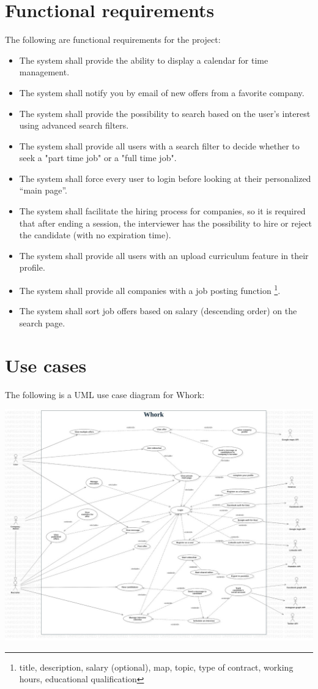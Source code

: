 \documentclass[12pt, a4paper]{article}
\begin{document}
\newpage
\section{Functional requirements}
The following are functional requirements for the project:
\begin{itemize}
	\item The system shall provide the ability to display a calendar for time management.
	\item The system shall notify you by email of new offers from a favorite company.
	\item The system shall provide the possibility to search based on the user's interest using advanced search filters.
	\item The system shall provide all users with a search filter to decide whether to seek a
	"part time job" or a "full time job".
	\item The system shall force every user to login before looking at their personalized “main page”.
	\item The system shall facilitate the hiring process for companies, so it is required that after ending a session, 
	the interviewer has the possibility to hire or reject the candidate (with no expiration time).
	\item The system shall provide all users with an upload curriculum feature in their profile.
	\item The system shall provide all companies with a job posting function
	\footnote{title, description, salary (optional), map, topic, type of contract, working hours, educational qualification}.
	\item The system shall sort job offers based on salary (descending order) on the search page.
\end{itemize}

\newpage
\section{Use cases}
The following is a UML use case diagram for Whork:

\begin{center}
	\includegraphics{diagrams/project/usecase/usecase_scaled.jpg}
\end{center}
\end{document}
